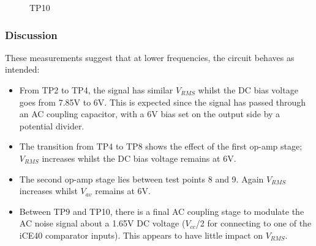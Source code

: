 \documentclass[12pt]{article}
\begin{document}
        \begin{figure}[H]
          \centering
          \qquad
          \caption{TP10}
          \label{fig:tp10_waveforms}
        \end{figure}
        \setcounter{subfigure}{0}

    \subsubsection{Discussion}
      These measurements suggest that at lower frequencies, the circuit behaves as intended:
      \begin{itemize}
        \item From TP2 to TP4, the signal has similar $V_{RMS}$ whilst the DC bias voltage goes from 7.85V to 6V. This is expected since the signal has passed through an AC coupling capacitor, with a 6V bias set on the output side by a potential divider.
        \item The transition from TP4 to TP8 shows the effect of the first op-amp stage; $V_{RMS}$ increases whilst the DC bias voltage remains at 6V.
        \item The second op-amp stage lies between test points 8 and 9. Again $V_{RMS}$ increases whilst $V_{av}$ remains at 6V.
        \item Between TP9 and TP10, there is a final AC coupling stage to modulate the AC noise signal about a 1.65V DC voltage ($V_{cc}$/2 for connecting to one of the iCE40 comparator inputs). This appears to have little impact on $V_{RMS}$.
      \end{itemize}
\end{document}
